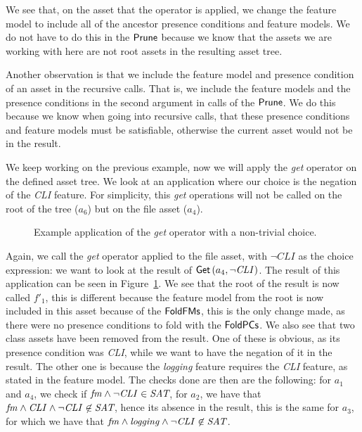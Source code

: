 We see that, on the asset that the operator is applied, we change the feature
model to include all of the ancestor presence conditions and feature models.
We do not have to do this in the \({\sf Prune}\) because we know that
the assets we are working with here are not root assets in the resulting asset
tree.

Another observation is that we include the feature model and presence
condition of an asset in the recursive calls. That is, we include the
feature models and the presence conditions in the second argument in calls of
the \({\sf Prune}\). We do this because we know when going into
recursive calls, that these presence conditions and feature models must be
satisfiable, otherwise the current asset would not be in the result.

\begin{example}\label{example:getoperator}
We keep working on the previous example, now we will apply the \emph{get}
operator on the defined asset tree. We look at an application where our choice is the
negation of the \emph{CLI} feature. For simplicity, this \emph{get} operations will
not be called on the root of the tree ($a_6$) but on the file asset ($a_4$).
\end{example}
\begin{figure}
  \centering
  \caption{Example application of the \emph{get} operator with a non-trivial choice.}
  \label{fig:example:get2}
\end{figure}
Again, we call the \emph{get} operator applied to the file asset, with \(\neg\mathit{CLI}\)
as the choice expression: we want to look at the result of \({\sf Get}\left(a_4, \neg\mathit{CLI}\right)\).
The result of this application can be seen in Figure~\ref{fig:example:get2}. We see that
the root of the result is now called $f'_1$, this is different because the feature model from
the root is now included in this asset because of the \({\sf FoldFMs}\), this is the only change
made, as there were no presence conditions to fold with the \({\sf FoldPCs}\). We also
see that two class assets have been removed from the result. One of these is
obvious, as its presence condition was \emph{CLI}, while we want to have the
negation of it in the result. The other one is because the \emph{logging} feature
requires the \emph{CLI} feature, as stated in the feature model. The checks done are
then are the following: for $a_1$ and $a_4$, we check if \( \mathit{fm} \land \neg\mathit{CLI} \in \textit{SAT} \),
for $a_2$, we have that \( \mathit{fm} \land \mathit{CLI} \land \neg\mathit{CLI} \not\in \textit{SAT} \),
hence its absence in the result, this is the same for $a_3$, for which we have that \(\mathit{fm} \land \mathit{logging} \land \neg\mathit{CLI} \not\in \textit{SAT}\).

